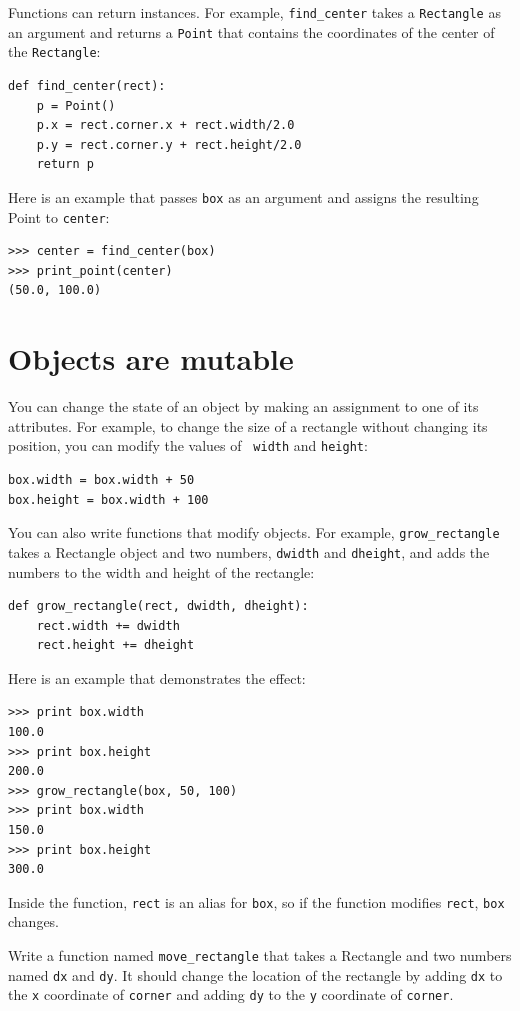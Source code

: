\documentclass[10pt]{book}
\begin{document}
Functions can return instances.  For example, \verb"find_center"
takes a {\tt Rectangle} as an argument and returns a {\tt Point}
that contains the coordinates of the center of the {\tt Rectangle}:

\begin{verbatim}
def find_center(rect):
    p = Point()
    p.x = rect.corner.x + rect.width/2.0
    p.y = rect.corner.y + rect.height/2.0
    return p
\end{verbatim}
%
Here is an example that passes {\tt box} as an argument and assigns
the resulting Point to {\tt center}:

\begin{verbatim}
>>> center = find_center(box)
>>> print_point(center)
(50.0, 100.0)
\end{verbatim}
%

\section{Objects are mutable}

You can change the state of an object by making an assignment to one of
its attributes.  For example, to change the size of a rectangle
without changing its position, you can modify the values of {\tt
width} and {\tt height}:

\begin{verbatim}
box.width = box.width + 50
box.height = box.width + 100
\end{verbatim}
%
You can also write functions that modify objects.  For example,
\verb"grow_rectangle" takes a Rectangle object and two numbers,
{\tt dwidth} and {\tt dheight}, and adds the numbers to the
width and height of the rectangle:

\begin{verbatim}
def grow_rectangle(rect, dwidth, dheight):
    rect.width += dwidth
    rect.height += dheight
\end{verbatim}
%
Here is an example that demonstrates the effect:

\begin{verbatim}
>>> print box.width
100.0
>>> print box.height
200.0
>>> grow_rectangle(box, 50, 100)
>>> print box.width
150.0
>>> print box.height
300.0
\end{verbatim}
%
Inside the function, {\tt rect} is an
alias for {\tt box}, so if the function modifies {\tt rect},
{\tt box} changes.

\begin{exercise}

Write a function named \verb"move_rectangle" that takes
a Rectangle and two numbers named {\tt dx} and {\tt dy}.  It
should change the location of the rectangle by adding {\tt dx}
to the {\tt x} coordinate of {\tt corner} and adding {\tt dy}
to the {\tt y} coordinate of {\tt corner}.

\end{exercise}
\end{document}
